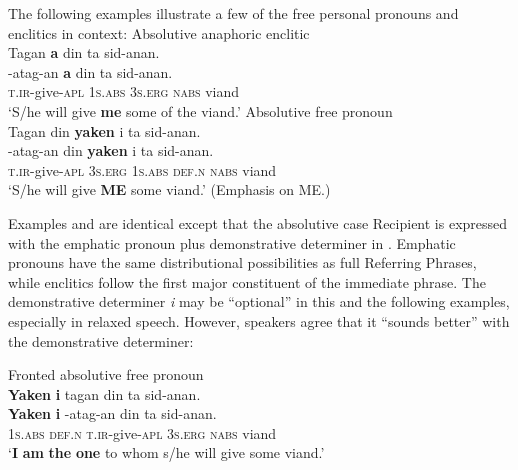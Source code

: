 The following examples illustrate a few of the free personal pronouns and enclitics in context:
\ea
\label{bkm:Ref419465634}
Absolutive anaphoric enclitic \\
Tagan  \textbf{a}   din  ta  sid-anan. \\\smallskip
 \gll \emptyset{}-atag-an\footnotemark{}  \textbf{a}   din  ta  sid-anan. \\
\textsc{t.ir}-give\textsc{-apl}  1\textsc{s.abs}  3\textsc{s.erg}  \textsc{nabs}  viand \\
\glt ‘S/he will give \textbf{me} some of the viand.’
\z
\ea
\label{bkm:Ref419465636}
Absolutive free pronoun \\
Tagan  din  \textbf{yaken}  i  ta  sid-anan. \\\smallskip
 \gll \emptyset{}-atag-an  din  \textbf{yaken}  i  ta  sid-anan. \\
\textsc{t.ir}-give\textsc{-apl}  3\textsc{s.erg}  1\textsc{s.abs}  \textsc{def.n}  \textsc{nabs}  viand \\
\glt ‘S/he will give \textbf{ME} some viand.’ (Emphasis on ME.)
\z

Examples  and  are identical except that the absolutive case Recipient is expressed with the emphatic pronoun plus demonstrative determiner in .  Emphatic pronouns have the same distributional possibilities as full Referring Phrases, while enclitics follow the first major constituent of the immediate phrase. The demonstrative determiner \textit{i} may be “optional” in this and the following examples, especially in relaxed speech. However, speakers agree that it “sounds better” with the demonstrative determiner:

\ea
Fronted absolutive free pronoun \\
\textbf{Yaken}  \textbf{i}   tagan  din  ta  sid-anan. \\\smallskip
 \gll \textbf{Yaken}  \textbf{i}   \emptyset{}-atag-an  din  ta  sid-anan. \\
1\textsc{s.abs}  \textsc{def.n} \textsc{t.ir}-give\textsc{-apl}  3\textsc{s.erg}  \textsc{nabs}  viand \\
\glt ‘\textbf{I} \textbf{am} \textbf{the} \textbf{one} to whom s/he will give some viand.’
\z

